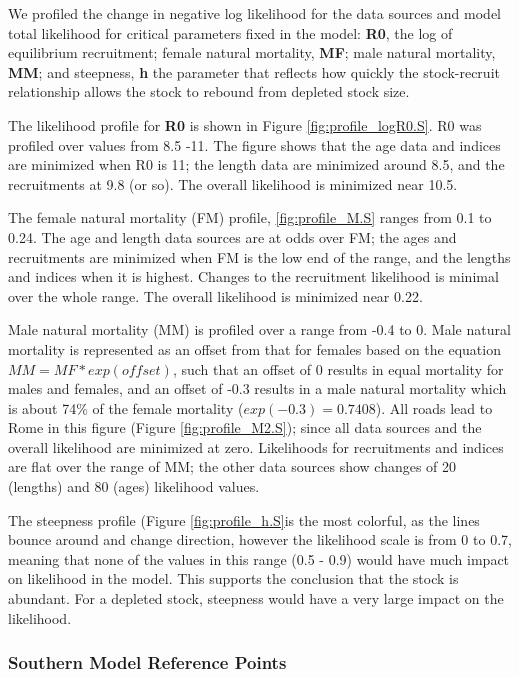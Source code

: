 \documentclass[12pt,]{article}
\begin{document}
We profiled the change in negative log likelihood for the data sources
and model total likelihood for critical parameters fixed in the model:
\textbf{R0}, the log of equilibrium recruitment; female natural
mortality, \textbf{MF}; male natural mortality, \textbf{MM}; and
steepness, \textbf{h} the parameter that reflects how quickly the
stock-recruit relationship allows the stock to rebound from depleted
stock size.

The likelihood profile for \textbf{R0} is shown in Figure
\ref{fig:profile_logR0.S}. R0 was profiled over values from 8.5 -11. The
figure shows that the age data and indices are minimized when R0 is 11;
the length data are minimized around 8.5, and the recruitments at 9.8
(or so). The overall likelihood is minimized near 10.5.

The female natural mortality (FM) profile, \ref{fig:profile_M.S} ranges
from 0.1 to 0.24. The age and length data sources are at odds over FM;
the ages and recruitments are minimized when FM is the low end of the
range, and the lengths and indices when it is highest. Changes to the
recruitment likelihood is minimal over the whole range. The overall
likelihood is minimized near 0.22.

Male natural mortality (MM) is profiled over a range from -0.4 to 0.
Male natural mortality is represented as an offset from that for females
based on the equation \(MM = MF*exp(offset)\), such that an offset of 0
results in equal mortality for males and females, and an offset of -0.3
results in a male natural mortality which is about 74\% of the female
mortality (\(exp(-0.3) = 0.7408\)). All roads lead to Rome in this
figure (Figure \ref{fig:profile_M2.S}); since all data sources and the
overall likelihood are minimized at zero. Likelihoods for recruitments
and indices are flat over the range of MM; the other data sources show
changes of 20 (lengths) and 80 (ages) likelihood values.

The steepness profile (Figure \ref{fig:profile_h.S}is the most colorful,
as the lines bounce around and change direction, however the likelihood
scale is from 0 to 0.7, meaning that none of the values in this range
(0.5 - 0.9) would have much impact on likelihood in the model. This
supports the conclusion that the stock is abundant. For a depleted
stock, steepness would have a very large impact on the likelihood.

\subsubsection{Southern Model Reference
Points}\label{southern-model-reference-points}
\end{document}
